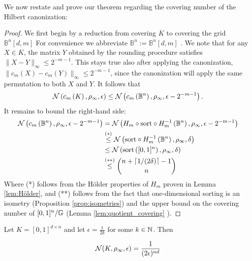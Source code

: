 \documentclass{article}
\begin{document}
We now restate and prove our theorem regarding the covering number of the Hilbert canonization:

\hilbert*
\begin{proof}
We first begin by a reduction from covering $K$ to covering the grid $\mathbb{B}^n[d,m] $ For convenience we abbreviate $\mathbb{B}^n:=\mathbb{B}^n[d,m] $ . We note that for any  $X \in K$, the matrix $Y$ obtained by the rounding procedure satisfies $\|X-Y\|_\infty\leq 2^{-m-1} $. This stays true also after applying the canonization,  $\|c_m(X)-c_m(Y)\|_\infty\leq 2^{-m-1} $, since the canonization will apply the same permutation to both $X$ and $Y$. It follows that 
$$\mathcal{N}\left(c_m\left(K \right),\rho_\infty,\epsilon \right)\leq \mathcal{N}\left(c_m\left(\mathbb{B}^n\right),\rho_\infty,\epsilon-2^{-m-1} \right) .$$
It remains to bound the right-hand side:
\begin{align*}
 \mathcal{N}\left(c_m\left(\mathbb{B}^n\right),\rho_\infty,\epsilon-2^{-m-1} \right)&=\mathcal{N}\left(H_m \circ \mathrm{sort} \circ H_m^{-1}\left(\mathbb{B}^n\right),\rho_\infty,\epsilon-2^{-m-1} \right) \\
 &\stackrel{(*)}{\leq} \mathcal{N}\left( \mathrm{sort} \circ H_m^{-1}\left(\mathbb{B}^n\right),\rho_\infty,\delta \right)\\
 &\leq \mathcal{N}\left( \mathrm{sort} \left( [0,1]^n \right),\rho_\infty,\delta \right)\\
 &\stackrel{(**)}{\leq}  \binom{n+\lceil 1/ (2\delta) \rceil-1}{n}
\end{align*}
Where (*) follows from the Hölder properties of $H_m$ proven in
Lemma \ref{lem:Hölder}, and (**) follows from the fact that one-dimensional sorting is an isometry (Proposition \ref{prop:isometries}) and the upper bound on the covering number of $[0,1]^n/\mathbb{G}$ (Lemma \ref{lem:quotient_covering} ).
\end{proof}
\begin{lemma}
\label{covering_cube}
Let $K=[0,1]^{d\times n}$ and let $\epsilon=\frac{1}{2k}$ for some $k\in\mathbb{N}$. Then

$$
\mathcal{N}(K,\rho_\infty,\epsilon)=\frac{1}{(2\epsilon)^{nd}}
$$

\end{lemma}
\end{document}
